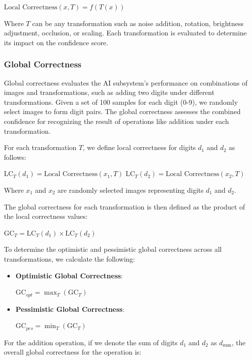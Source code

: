 \documentclass[10pt, conference, a4paper, final]{IEEEtran}
\begin{document}
    $ \text{Local Correctness}(x, T) = f(T(x))$


    Where $T$ can be any transformation such as noise addition, rotation, brightness adjustment, occlusion, or scaling. Each transformation is evaluated to determine its impact on the confidence score.

    
    \subsubsection{Global Correctness}

    Global correctness evaluates the AI subsystem's performance on combinations of images and transformations, such as adding two digits under different transformations. Given a set of 100 samples for each digit (0-9), we randomly select images to form digit pairs. The global correctness assesses the combined confidence for recognizing the result of operations like addition under each transformation.

    For each transformation $T$, we define local correctness for digits $d_1$ and $d_2$ as follows:
    
    $ \text{LC}_{T}(d_1) = \text{Local Correctness}(x_1, T)$
    $\text{LC}_{T}(d_2) = \text{Local Correctness}(x_2, T)$
    

    Where $x_1$ and $x_2$ are randomly selected images representing digits $d_1$ and $d_2$.
    
    The global correctness for each transformation is then defined as the product of the local correctness values:
    
    $\text{GC}_{T} = \text{LC}_{T}(d_1) \times \text{LC}_{T}(d_2)$
    
    To determine the optimistic and pessimistic global correctness across all transformations, we calculate the following:
    
    \begin{itemize}
        \item \textbf{Optimistic Global Correctness}:

        $\text{GC}_{opt} = \max_{T} (\text{GC}_{T})$
        \item \textbf{Pessimistic Global Correctness}:
    
        $\text{GC}_{pes} = \min_{T} (\text{GC}_{T})$

    \end{itemize}
    
    For the addition operation, if we denote the sum of digits $d_1$ and $d_2$ as $d_{\text{sum}}$, the overall global correctness for the operation is:
    
\end{document}
